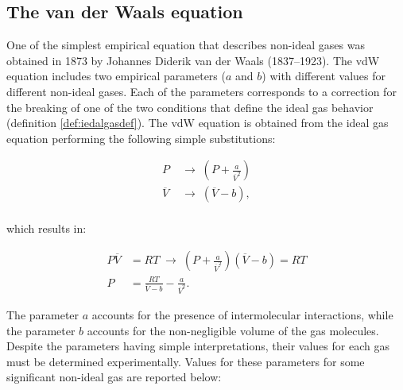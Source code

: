 \documentclass[
  9pt,
]{extbook}
\theoremstyle{definition}
\theoremstyle{definition}
\theoremstyle{definition}
\theoremstyle{definition}
\theoremstyle{remark}
\begin{document}
\subsection{The van der Waals equation}\label{the-van-der-waals-equation}

One of the simplest empirical equation that describes non-ideal gases was obtained in 1873 by Johannes Diderik van der Waals (1837--1923). The vdW equation includes two empirical parameters (\(a\) and \(b\)) with different values for different non-ideal gases. Each of the parameters corresponds to a correction for the breaking of one of the two conditions that define the ideal gas behavior (definition \ref{def:iedalgasdef}). The vdW equation is obtained from the ideal gas equation performing the following simple substitutions:

\begin{equation}
\begin{aligned}
P & \;\rightarrow\;\left( P + \frac{a}{\overline{V}^2} \right)\\
\overline{V} & \;\rightarrow\;\left( \overline{V} - b\right),\\
\end{aligned}
\label{eq:vdWeq1}
\end{equation}

which results in:

\begin{equation}
\begin{aligned}
P\overline{V} &=RT \; \rightarrow \; \left( P + \frac{a}{\overline{V}^2} \right)\left( \overline{V} - b\right)=RT\\
P &=\frac{RT}{\overline{V} - b}-\frac{a}{\overline{V}^2}.
\end{aligned}
\label{eq:vdWeq2}
\end{equation}

The parameter \(a\) accounts for the presence of intermolecular interactions, while the parameter \(b\) accounts for the non-negligible volume of the gas molecules. Despite the parameters having simple interpretations, their values for each gas must be determined experimentally. Values for these parameters for some significant non-ideal gas are reported below:

\scriptsize
\end{document}
